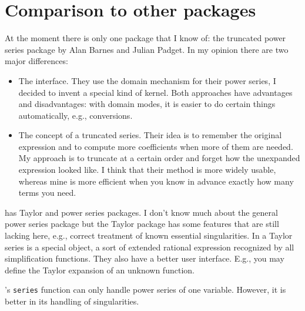 \section{Comparison to other packages}

At the moment there is only one \REDUCE{} package that I know of:
the truncated power series package by Alan Barnes and Julian Padget.
In my opinion there are two major differences:
\begin{itemize}
  \item The interface. They use the domain mechanism for their power
        series, I decided to invent a special kind of kernel. Both
        approaches have advantages and disadvantages: with domain
        modes, it is easier
        to do certain things automatically, e.g., conversions.
  \item The concept of a truncated series. Their idea is to remember
        the original expression and to compute more coefficients when
        more of them are needed. My approach is to truncate at a
        certain order and forget how the unexpanded expression
        looked like.  I think that their method is more widely
        usable, whereas mine is more efficient when you know in
        advance exactly how many terms you need.
\end{itemize}

\MACSYMA{} has Taylor and power series packages.  I don't know much
about the general power series package but the Taylor package has some
features that are still lacking here, e.g., correct treatment of
known essential singularities.  In \MACSYMA{} a Taylor series is a
special object, a sort of extended rational expression recognized by
all simplification functions.  They also have a better user interface. 
E.g., you may define the Taylor expansion of an unknown function. 

\Mathematica's \verb|series| function can only handle power series of
one variable.  However, it is better in its handling of singularities.


